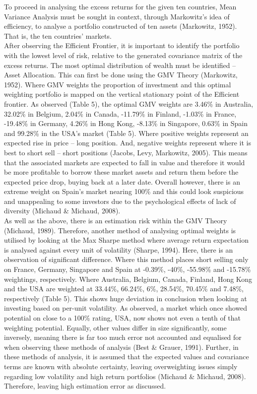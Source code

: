 \documentclass[11pt, english]{article}
\begin{document}
	To proceed in analysing the excess returns for the given ten countries, Mean Variance Analysis must be sought in context, through Markowitz’s idea of efficiency, to analyse a portfolio constructed of ten assets (Markowitz, 1952). That is, the ten countries’ markets.\\

	After observing the Efficient Frontier, it is important to identify the portfolio with the lowest level of risk, relative to the generated covariance matrix of the excess returns. The most optimal distribution of wealth must be identified – Asset Allocation. This can first be done using the GMV Theory (Markowitz, 1952). Where GMV weights the proportion of investment and this optimal weighting portfolio is mapped on the vertical stationary point of the Efficient frontier. As observed (Table 5), the optimal GMV weights are 3.46\% in Australia, 32.02\% in Belgium, 2.04\% in Canada, -11.79\% in Finland, -1.03\% in France, -19.48\% in Germany, 4.26\% in Hong Kong, -8.13\% in Singapore, 0.63\% in Spain and 99.28\% in the USA’s market (Table 5). Where positive weights represent an expected rise in price – long position. And, negative weights represent where it is best to short sell – short positions (Jacobs, Levy, Markowitz, 2005). This means that the associated markets are expected to fall in value and therefore it would be more profitable to borrow these market assets and return them before the expected price drop, buying back at a later date. Overall however, there is an extreme weight on Spain’s market nearing 100\% and this could look suspicious and unappealing to some investors due to the psychological effects of lack of diversity (Michaud \& Michaud, 2008).\\

	As well as the above, there is an estimation risk within the GMV Theory (Michaud, 1989). Therefore, another method of analysing optimal weights is utilised by looking at the Max Sharpe method where average return expectation is analysed against every unit of volatility (Sharpe, 1994). Here, there is an observation of significant difference. Where this method places short selling only on France, Germany, Singapore and Spain at -0.39\%, -40\%, -55.98\% and -15.78\% weightings, respectively. Where Australia, Belgium, Canada, Finland, Hong Kong and the USA are weighted at 33.44\%, 66.24\%, 6\%, 28.54\%, 70.45\% and 7.48\%, respectively (Table 5). This shows huge deviation in conclusion when looking at investing based on per-unit volatility. As observed, a market which once showed potential on close to a 100\% rating, USA, now shows not even a tenth of that weighting potential. Equally, other values differ in size significantly, some inversely, meaning there is far too much error not accounted and equalised for when observing these methods of analysis (Best \& Grauer, 1991). Further, in these methods of analysis, it is assumed that the expected values and covariance terms are known with absolute certainty, leaving overweighting issues simply regarding low volatility and high return portfolios (Michaud \& Michaud, 2008). Therefore, leaving high estimation error as discussed.
\end{document}
